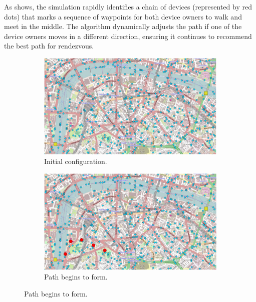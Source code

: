 As  shows, the simulation rapidly identifies a chain of devices (represented by red dots) that marks a sequence of waypoints for both device owners to walk and meet in the middle. The algorithm dynamically adjusts the path if one of the device owners moves in a different direction, ensuring it continues to recommend the best path for rendezvous.



\begin{figure}
    \centering
    \begin{subfigure}[b]{.49\textwidth}
        \centering
        \includegraphics[width=\textwidth]{figures/protelis-example-a.png}
        \caption{Initial configuration.}
        \label{fig:protelis-example-a}
    \end{subfigure}
    \hfill
    \begin{subfigure}[b]{.49\textwidth}
        \centering
        \includegraphics[width=\textwidth]{figures/protelis-example-b.png}
        \caption{Path begins to form.}

\end{subfigure}
\end{figure}
